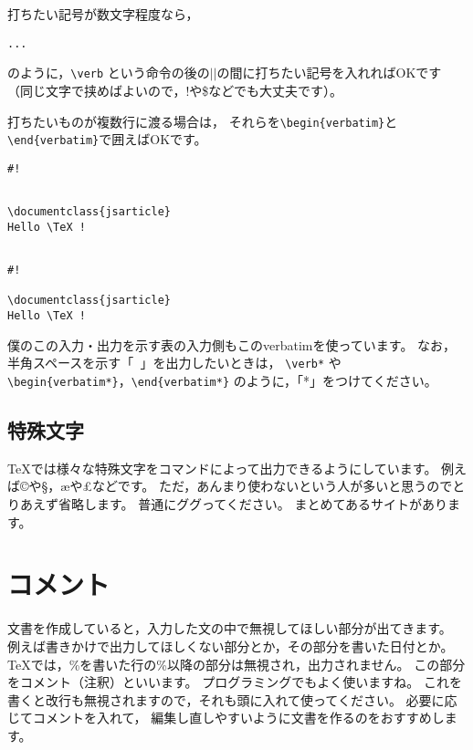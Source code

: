 打ちたい記号が数文字程度なら，
\begin{ITeX}
\verb|...|
\end{ITeX}
のように，\verb|\verb| という命令の後の$| |$の間に打ちたい記号を入れればOKです
（同じ文字で挟めばよいので，!や{\$}などでも大丈夫です）。

打ちたいものが複数行に渡る場合は，
それらを\verb|\begin{verbatim}|と\verb|\end{verbatim}|で囲えばOKです。

\begin{IOtcb}
\begin{verbatim*}
\verb|#!|

\begin{verbatim}

\documentclass{jsarticle}
Hello \TeX !

\end{verbatim}
\end{verbatim*}
\tcblower

\begin{verbatim}

#!

\documentclass{jsarticle}
Hello \TeX !

\end{verbatim}
\end{IOtcb}

僕のこの入力・出力を示す表の入力側もこのverbatimを使っています。
なお，半角スペースを示す「\verb*| |」を出力したいときは，
\verb|\verb*| や \verb*|\begin{verbatim*}|，\verb|\end{verbatim*}|
のように，「*」をつけてください。


\subsection{特殊文字}
{\TeX}では様々な特殊文字をコマンドによって出力できるようにしています。
例えば{\copyright}や{\S}，{\ae}や{\pounds}などです。
ただ，あんまり使わないという人が多いと思うのでとりあえず省略します。
普通にググってください。
まとめてあるサイトがあります。



\section{コメント}
文書を作成していると，入力した文の中で無視してほしい部分が出てきます。
例えば書きかけで出力してほしくない部分とか，その部分を書いた日付とか。
{\TeX}では，{\%}を書いた行の{\%}以降の部分は無視され，出力されません。
この部分をコメント（注釈）といいます。
プログラミングでもよく使いますね。
これを書くと改行も無視されますので，それも頭に入れて使ってください。
必要に応じてコメントを入れて，
編集し直しやすいように文書を作るのをおすすめします。

